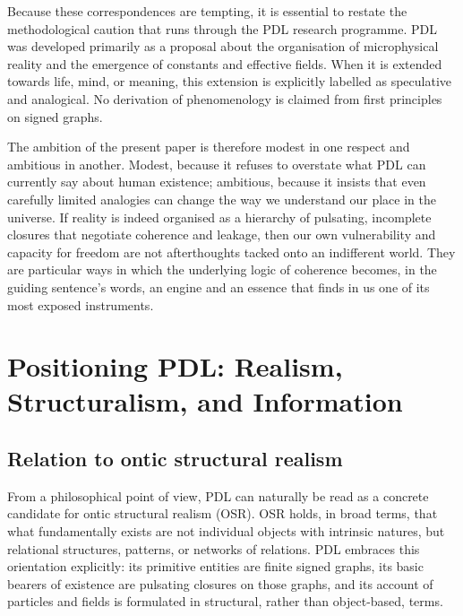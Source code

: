 \documentclass[11pt,a4paper]{article}
\theoremstyle{definition}
\begin{document}
Because these correspondences are tempting, it is essential to restate the methodological caution that runs through the PDL research programme.\cite{Laubscher_PDL_Position_2024,Laubscher_Existence_PulsatingClosure_2026} PDL was developed primarily as a proposal about the organisation of microphysical reality and the emergence of constants and effective fields. When it is extended towards life, mind, or meaning, this extension is explicitly labelled as speculative and analogical. No derivation of phenomenology is claimed from first principles on signed graphs.

The ambition of the present paper is therefore modest in one respect and ambitious in another. Modest, because it refuses to overstate what PDL can currently say about human existence; ambitious, because it insists that even carefully limited analogies can change the way we understand our place in the universe. If reality is indeed organised as a hierarchy of pulsating, incomplete closures that negotiate coherence and leakage, then our own vulnerability and capacity for freedom are not afterthoughts tacked onto an indifferent world. They are particular ways in which the underlying logic of coherence becomes, in the guiding sentence’s words, an engine and an essence that finds in us one of its most exposed instruments.

\section{Positioning PDL: Realism, Structuralism, and Information}
\label{sec:positioning}

\subsection{Relation to ontic structural realism}

From a philosophical point of view, PDL can naturally be read as a concrete candidate for ontic structural realism (OSR). OSR holds, in broad terms, that what fundamentally exists are not individual objects with intrinsic natures, but relational structures, patterns, or networks of relations.\cite{Laubscher_Existence_PulsatingClosure_2026,Laubscher_PDL_Position_2024} PDL embraces this orientation explicitly: its primitive entities are finite signed graphs, its basic bearers of existence are pulsating closures on those graphs, and its account of particles and fields is formulated in structural, rather than object-based, terms.\cite{Laubscher_EmergencePhysicalReality_2024,Laubscher_MinimalClosures_46_2024}
\end{document}

